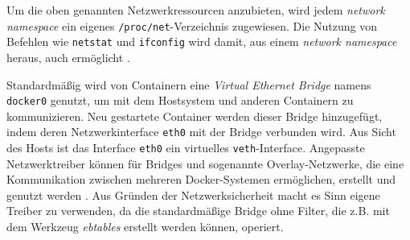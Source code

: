 \documentclass[../main.tex]{subfiles}
\begin{document}
			Um die oben genannten Netzwerkressourcen anzubieten, wird jedem \emph{network namespace} ein eigenes \texttt{/proc/net}-Verzeichnis zugewiesen. Die Nutzung von Befehlen wie \texttt{netstat} und \texttt{ifconfig} wird damit, aus einem \emph{network namespace} heraus, auch ermöglicht \cite[S.7]{IBMcheckpointRestart}.

			Standardmäßig wird von Containern eine \emph{Virtual Ethernet Bridge} namens \texttt{docker0} genutzt, um mit dem Hostsystem und anderen Containern zu kommunizieren. Neu gestartete Container werden dieser Bridge hinzugefügt, indem deren Netzwerkinterface \texttt{eth0} mit der Bridge verbunden wird. Aus Sicht des Hosts ist das Interface \texttt{eth0} ein virtuelles \texttt{veth}-Interface. Angepasste Netzwerktreiber können für Bridges und sogenannte Overlay-Netzwerke, die eine Kommunikation zwischen mehreren Docker-Systemen ermöglichen, erstellt und genutzt werden \cite[S.3]{virtVSContainer}\cite{dockerNetworking}. Aus Gründen der Netzwerksicherheit macht es Sinn eigene Treiber zu verwenden, da die standardmäßige Bridge ohne Filter, die z.B. mit dem Werkzeug \emph{ebtables} erstellt werden können, operiert.


\end{document}
